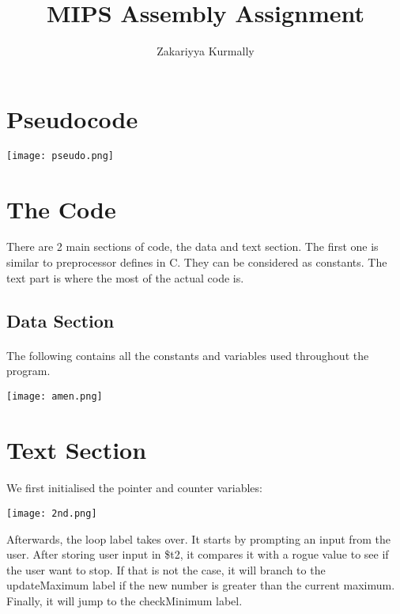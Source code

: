 \documentclass{article}
\title{MIPS Assembly Assignment}
\author{Zakariyya Kurmally}
\begin{document}
\maketitle

\pagebreak

\section{Pseudocode}
\begin{center}
  \texttt{[image: pseudo.png]}
\end{center}

\section{The Code}
There are 2 main sections of code, the data and text section. The first
one is similar to preprocessor defines in C. They can be considered as
constants. The text part is where the most of the actual code is. 

\pagebreak

\subsection{Data Section}
\paragraph{}
The following contains all the constants and variables used throughout the 
program. 

\begin{center}
  \texttt{[image: amen.png]}
\end{center}

\section{Text Section}
\paragraph{}
We first initialised the pointer and counter variables:

\begin{center}
  \texttt{[image: 2nd.png]}
\end{center}

Afterwards, the loop label takes over. It starts by prompting an input
from the user. After storing user input in \$t2, it compares it with a 
rogue value to see if the user want to stop. If that is not the
case, it will branch to the updateMaximum label if the new number
is greater than the current maximum. Finally, it will jump to
the checkMinimum label.
\end{document}

